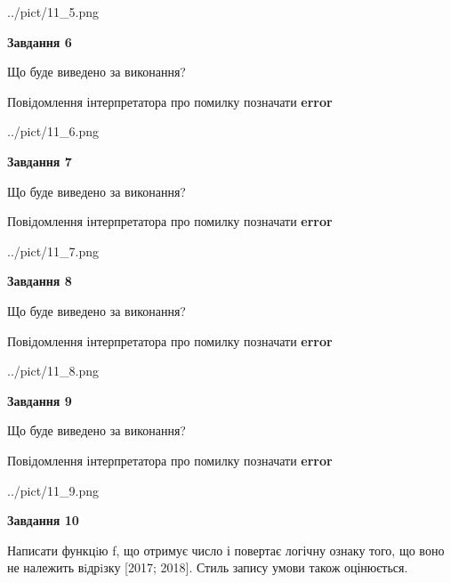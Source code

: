\documentclass[12pt, ukrainian]{article}
\begin{document}
{\begin {large}
\begin{center}
	{../pict/11_5.png}
\end{center}
\newpage

{\begin {center}\textbf{Завдання 6}\end {center}}\par
Що буде виведено за виконання? \par
Повідомлення інтерпретатора про помилку позначати \textbf{error}

\begin{center}
	{../pict/11_6.png}
\end{center}
\newpage

{\begin {center}\textbf{Завдання 7}\end {center}}\par
Що буде виведено за виконання? \par
Повідомлення інтерпретатора про помилку позначати \textbf{error}

\begin{center}
	{../pict/11_7.png}
\end{center}
\newpage

{\begin {center}\textbf{Завдання 8}\end {center}}\par
Що буде виведено за виконання? \par
Повідомлення інтерпретатора про помилку позначати \textbf{error}

\begin{center}
	{../pict/11_8.png}
\end{center}
\newpage

{\begin {center}\textbf{Завдання 9}\end {center}}\par
Що буде виведено за виконання? \par
Повідомлення інтерпретатора про помилку позначати \textbf{error}

\begin{center}
	{../pict/11_9.png}
\end{center}
\newpage

{\begin {center}\textbf{Завдання 10}\end {center}}\par

Написати функцiю f, що отримує число і повертає логічну ознаку того, що воно не належить вiдрiзку [2017; 2018]. Стиль запису умови також оцінюється.\par
\newpage

\end {large}}
\end{document}
